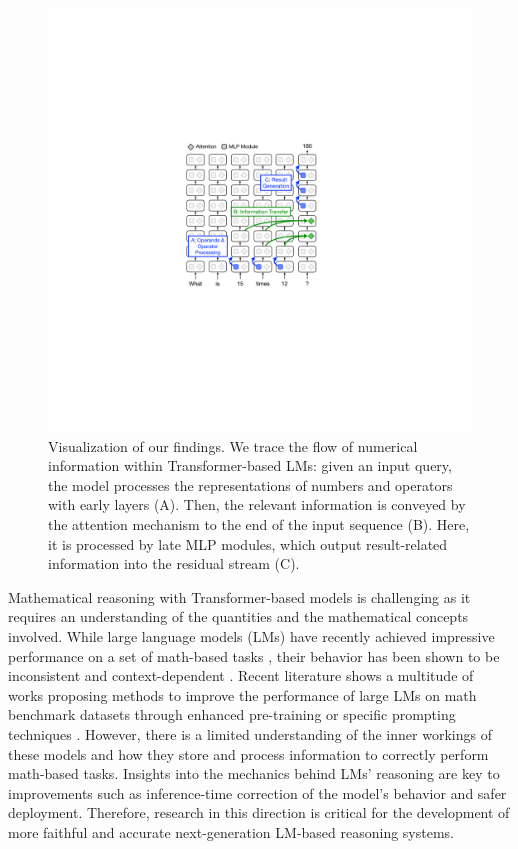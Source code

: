 \documentclass[11pt]{article}
\begin{document}
\begin{figure}[t]
    \centering
    \includegraphics[width=0.85\columnwidth]{img/info_flow.pdf}
    \caption{Visualization of our findings. We trace the flow of numerical information within Transformer-based LMs: given an input query, the model processes the representations of numbers and operators with early layers (A). Then, the relevant information is conveyed by the attention mechanism to the end of the input sequence (B). Here, it is processed by late MLP modules, which output result-related information into the residual stream (C).
    }
    \label{fig:info_flow}
    \vspace{-12pt}
\end{figure}


Mathematical reasoning with Transformer-based models \cite{vaswani2017attention} is challenging as it requires an understanding of the quantities and the mathematical concepts involved.
While large language models (LMs) have recently achieved impressive performance on a set of math-based tasks \cite{wei2022emergent, chowdhery2022palm, openai2023gpt4}, their behavior has been shown to be inconsistent and context-dependent \cite{bubeck2023sparks}. 
Recent literature shows a multitude of works proposing methods to improve the performance of large LMs on math benchmark datasets through enhanced pre-training \cite{spokoyny-etal-2022-masked, lewkowycz2022solving, liu2023goat} or specific prompting techniques \cite[\textit{inter alia}]{chain-of-thought, kojima2022large, yang2023large}. However, there is a limited understanding of the inner workings of these models and how they store and process information to correctly perform math-based tasks.
Insights into the mechanics behind LMs' reasoning are key to improvements such as inference-time correction of the model's behavior \cite{li2023inferencetime} and safer deployment. Therefore, research in this direction is critical for the development of more faithful and accurate next-generation LM-based reasoning systems.
\end{document}
